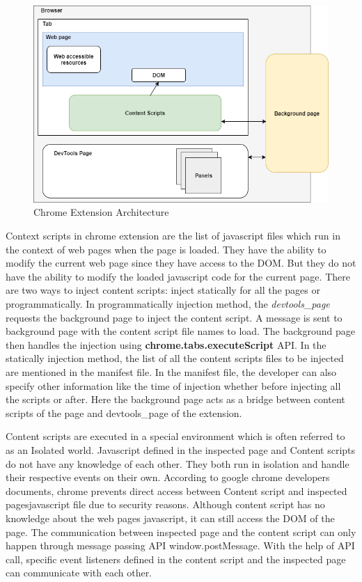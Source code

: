 \begin{figure}[!h]
	\centering
	\includegraphics[scale=0.5,trim=0 0 0 0]{images/chrome-extension-architecture.png}
	\caption{Chrome Extension Architecture}
	\label{fig:extension-architecture}
\end{figure}

Context scripts in chrome extension are the list of javascript files which run in the context of web pages when the page is loaded\cite{contentscripts}. They have the ability to modify the current web page since they have access to the DOM. But they do not have the ability to modify the loaded javascript code for the current page. There are two ways to inject content scripts: inject statically for all the pages or programmatically. In programmatically injection method, the \textit{devtools\_page} requests the background page to inject the content script. A message is sent to background page with the content script file names to load. The background page then handles the injection using \textbf{chrome.tabs.executeScript} API. In the statically injection method, the list of all the content scripts files to be injected are mentioned in the manifest file. In the manifest file, the developer can also specify other information like the time of injection whether before injecting all the scripts or after. Here the background page acts as a bridge between content scripts of the page and devtools\_page of the extension.

Content scripts are executed in a special environment which is often referred to as an Isolated world\cite{contentscripts}. Javascript defined in the inspected page and Content scripts do not have any knowledge of each other. They both run in isolation and handle their respective events on their own\cite{contentscripts}. According to google chrome developers documents, chrome prevents direct access between Content script and inspected pages\textquotesingle javascript file due to security reasons. Although content script has no knowledge about the web page\textquotesingle s javascript, it can still access the DOM of the page. The communication between inspected page and the content script can only happen through message passing API window.postMessage\cite{contentscripts}. With the help of API call, specific event listeners defined in the content script and the inspected page can communicate with each other.


